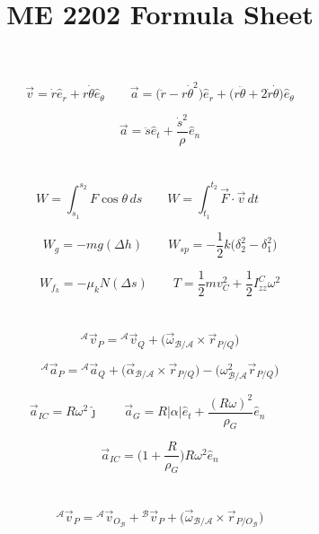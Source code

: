 \documentclass{article}
\title{\vspace{-2cm}ME 2202 Formula Sheet}
\author{\vspace{-5ex}}
\date{\vspace{-5ex}}
\begin{document}
\maketitle

\begin{multicols}{2}[\raggedcolumns]

\section*{}
\[
\vec v=\dot r\hat e_r+r\dot\theta\hat e_\theta \qquad
\vec a=\bigl(\ddot r-r\dot\theta^2\bigr)\hat e_r+\bigl(r\ddot\theta+2\dot r\dot\theta\bigr)\hat e_\theta
\]

\[
\vec a=\ddot s\hat e_t+\frac{\dot s^2}{\rho}\hat e_n
\]

\section*{}
\[
W=\int_{s_1}^{s_2}F\cos\theta\,ds \qquad
W=\int_{t_1}^{t_2}\vec F\cdot\vec v\,dt \qquad
\]

\[
W_g=-mg(\Delta h) \qquad
W_{sp}=-\frac{1}{2}k\bigl(\delta_2^2-\delta_1^2\bigr)
\]

\[
W_{f_k}=-\mu_kN(\Delta s) \qquad
T=\frac{1}{2}mv_C^2+\frac{1}{2}I_{zz}^C\omega^2
\]

\section*{}
\[
{}^\mathcal A\vec v_P={}^\mathcal A\vec v_Q+\bigl(\vec\omega_{\mathcal B/\mathcal A}\times\vec r_{P/Q}\bigr)
\]

\[
{}^\mathcal A\vec a_P={}^\mathcal A\vec a_Q+\bigl(\vec\alpha_{\mathcal B/\mathcal A}\times\vec r_{P/Q}\bigr)-\bigl(\omega_{\mathcal B/\mathcal A}^2\vec r_{P/Q}\bigr)
\]

\[
\vec a_{IC}=R\omega^2\hat\jmath \qquad
\vec a_G=R|\alpha|\hat e_t+\frac{(R\omega)^2}{\rho_G}\hat e_n \qquad
\]

\[
\vec a_{IC}=\biggl(1+\frac{R}{\rho_G}\biggr)R\omega^2\hat e_n
\]

\columnbreak

\section*{}
\[
{}^\mathcal A\vec v_P={}^\mathcal A\vec v_{O_\mathcal B}+{}^\mathcal B\vec v_P+\bigl(\vec\omega_{\mathcal B/\mathcal A}\times\vec r_{P/O_\mathcal B}\bigr)
\]


\end{multicols}
\end{document}

